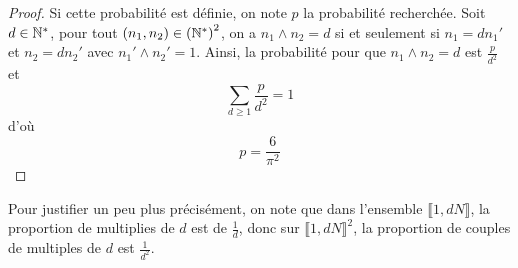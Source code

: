 \begin{proof}
    Si cette probabilité est définie, on note $p$ la probabilité recherchée. Soit $d\in\mathbb{N}^{*}$, pour tout $(n_{1},n_{2})\in\left(\mathbb{N}^{*}\right)^{2}$, on a $n_{1}\wedge n_{2}=d$ si et seulement si $n_{1}=dn_{1}'$ et $n_{2}=dn_{2}'$ avec $n_{1}'\wedge n_{2}'=1$. Ainsi, la probabilité pour que $n_{1}\wedge n_{2}=d$ est $\frac{p}{d^{2}}$ et 
    \begin{equation}
        \sum_{d\geqslant1}\frac{p}{d^{2}}=1
    \end{equation}
    d'où 
    \begin{equation}
        \boxed{p=\frac{6}{\pi^{2}}}
    \end{equation}
\end{proof}

\begin{remark}
    Pour justifier un peu plus précisément, on note que dans l'ensemble $\llbracket 1,dN\rrbracket$, la proportion de multiplies de $d$ est de $\frac{1}{d}$, donc sur $\llbracket 1,dN\rrbracket^{2}$, la proportion de couples de multiples de $d$ est  $\frac{1}{d^{2}}$.
\end{remark}

